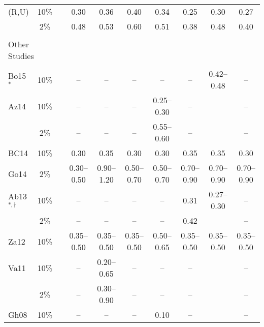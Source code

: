 \begin{table*}[t]
\begin{tabular}{lccccccccc}
    (R,U)   &  10\%  &&   0.30      &   0.36      &   0.40      &   0.34      &   0.25      &   0.30      &   0.27      \\
            &   2\%  &&   0.48      &   0.53      &   0.60      &   0.51      &   0.38      &   0.48      &   0.40      \\
    \hline                                                                                                              \\[-1.6ex]
    \multicolumn{2}{l}{Other Studies}                                                                                   \\[0.6ex]
    \cline{1-2} \cline{4-10}                                                                                            \\[-1.6ex]
    Bo15${}^{*}$ 
            &  10\%  &&   --        &   --        &   --        &   --        &   --        & 0.42--0.48  &   --        \\
    Az14    &  10\%  &&   --        &   --        &   --        & 0.25--0.30  &   --        &             &   --        \\
            &   2\%  &&   --        &   --        &   --        & 0.55--0.60  &   --        &             &   --        \\
    BC14    &  10\%  &&   0.30      &   0.35      &   0.30      &   0.30      &   0.35      &   0.35      &   0.30      \\
    Go14    &   2\%  && 0.30--0.50  & 0.90--1.20  & 0.50--0.70  & 0.50--0.70  & 0.70--0.90  & 0.70--0.90  & 0.70--0.90  \\
    Ab13${}^{*,\dagger}$ 
            &  10\%  &&   --        &   --        &   --        &   --        &   0.31      & 0.27--0.30  &   --        \\
            &   2\%  &&   --        &   --        &   --        &   --        &   0.42      &             &   --        \\
    Za12    &  10\%  && 0.35--0.50  & 0.35--0.50  & 0.35--0.50  & 0.50--0.65  & 0.35--0.50  & 0.35--0.50  & 0.35--0.50  \\
    Va11    &  10\%  &&   --        & 0.20--0.65  &   --        &   --        &   --        &             &   --        \\
            &   2\%  &&   --        & 0.30--0.90  &   --        &   --        &   --        &             &   --        \\
    Gh08    &  10\%  &&   --        &   --        &   --        &   0.10      &   --        &             &   --        \\

\end{tabular}
\end{table*}
